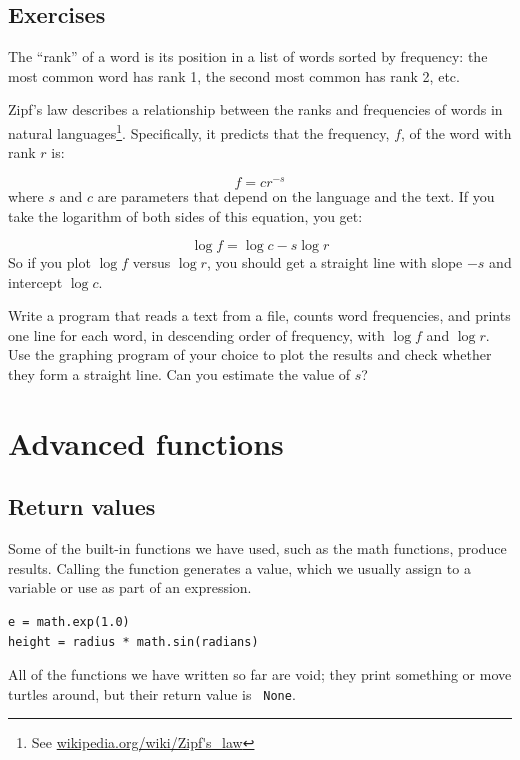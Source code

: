 \documentclass[10pt]{book}
\begin{document}
\section{Exercises}

\begin{ex}


The ``rank'' of a word is its position in a list of words
sorted by frequency: the most common word has rank 1, the
second most common has rank 2, etc.

Zipf's law describes a relationship between the ranks and frequencies
of words in natural languages\footnote{See
  \url{wikipedia.org/wiki/Zipf's_law}}.  Specifically, it
predicts that the frequency, $f$, of the word with rank $r$ is:

\[ f = c r^{-s} \]
%
where $s$ and $c$ are parameters that depend on the language and the
text.  If you take the logarithm of both sides of this equation, you
get:


\[ \log f = \log c - s \log r \]
%
So if you plot $\log f$ versus $\log r$, you should get
a straight line with slope $-s$ and intercept $\log c$.

Write a program that reads a text from a file, counts
word frequencies, and prints one line
for each word, in descending order of frequency, with
$\log f$ and $\log r$.  Use the graphing program of your
choice to plot the results and check whether they form
a straight line.  Can you estimate the value of $s$?
\end{ex}

\chapter{Advanced functions}
\label{fruitchap}

\section{Return values}

Some of the built-in functions we have used, such as the math
functions, produce results.  Calling the function generates a
value, which we usually assign to a variable or use as part of an
expression.

\beforeverb
\begin{verbatim}
e = math.exp(1.0)
height = radius * math.sin(radians)
\end{verbatim}
\afterverb
%
All of the functions we have written so far are void; they print
something or move turtles around, but their return value is {\tt
None}.
\end{document}
